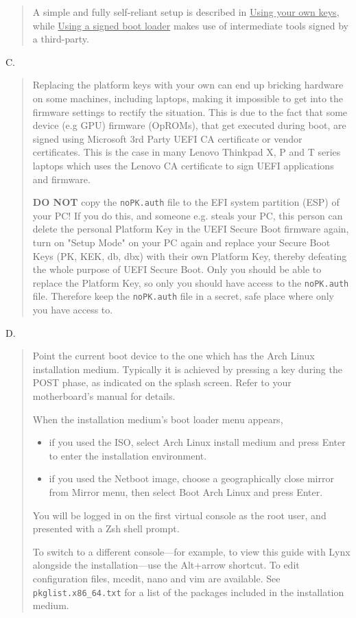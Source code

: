 \documentclass{exam-zh}
\begin{document}
\begin{question}
\begin{quote}
  A simple and fully self-reliant setup is described in \underline{Using your own keys}, while \allowbreak \underline{Using a signed boot loader} makes use of intermediate tools signed by a third-party.
\end{quote}

C.
\begin{quote}
  Replacing the platform keys with your own can end up bricking hardware on some machines, including laptops, making it impossible to get into the firmware settings to rectify the situation. This is due to the fact that some device (e.g GPU) firmware (OpROMs), that get executed during boot, are signed using Microsoft 3rd Party UEFI CA certificate or vendor certificates. This is the case in many Lenovo Thinkpad X, P and T series laptops which uses the Lenovo CA certificate to sign UEFI applications and firmware.

  \textbf{DO NOT} copy the \texttt{noPK.auth} file to the EFI system partition (ESP) of your PC! If you do this, and someone e.g. steals your PC, this person can delete the personal Platform Key in the UEFI Secure Boot firmware again, turn on "Setup Mode" on your PC again and replace your Secure Boot Keys (PK, KEK, db, dbx) with their own Platform Key, thereby defeating the whole purpose of UEFI Secure Boot. Only you should be able to replace the Platform Key, so only you should have access to the \texttt{noPK.auth} file. Therefore keep the \texttt{noPK.auth} file in a secret, safe place where only you have access to.
\end{quote}

D.
\begin{quote}
  Point the current boot device to the one which has the Arch Linux installation medium. Typically it is achieved by pressing a key during the POST phase, as indicated on the splash screen. Refer to your motherboard's manual for details.

  When the installation medium's boot loader menu appears,

  \begin{itemize}
    \item if you used the ISO, select Arch Linux install medium and press Enter to enter the installation environment.

    \item if you used the Netboot image, choose a geographically close mirror from Mirror menu, then select Boot Arch Linux and press Enter.
  \end{itemize}

  You will be logged in on the first virtual console as the root user, and presented with a Zsh shell prompt.

  To switch to a different console—for example, to view this guide with Lynx alongside the installation—use the Alt+arrow shortcut. To edit configuration files, mcedit, nano and vim are available. See \texttt{pkglist.x86\_64.txt} for a list of the packages included in the installation medium.
\end{quote}
\end{question}
\end{document}
